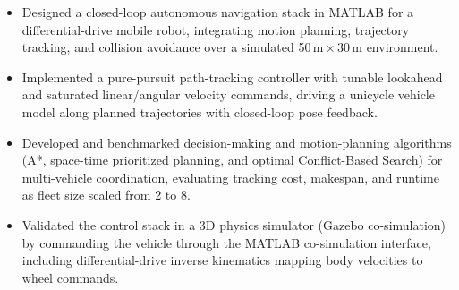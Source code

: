 
\begin{itemize}
  \item Designed a closed-loop autonomous navigation stack in MATLAB for a
        differential-drive mobile robot, integrating motion planning,
        trajectory tracking, and collision avoidance over a simulated
        50\,m\,$\times$\,30\,m environment.
  \item Implemented a pure-pursuit path-tracking controller with tunable
        lookahead and saturated linear/angular velocity commands, driving a
        unicycle vehicle model along planned trajectories with closed-loop
        pose feedback.
  \item Developed and benchmarked decision-making and motion-planning
        algorithms (A*, space-time prioritized planning, and optimal
        Conflict-Based Search) for multi-vehicle coordination, evaluating
        tracking cost, makespan, and runtime as fleet size scaled from 2 to 8.
  \item Validated the control stack in a 3D physics simulator (Gazebo
        co-simulation) by commanding the vehicle through the MATLAB
        co-simulation interface, including differential-drive inverse
        kinematics mapping body velocities to wheel commands.
\end{itemize}

